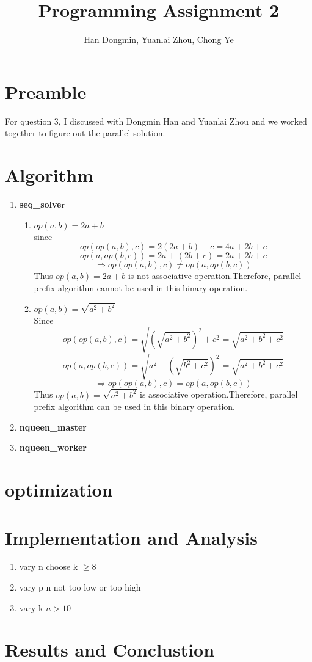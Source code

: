 \documentclass[twoside,12pt]{article}
\title{Programming Assignment 2}
\author{Han Dongmin, Yuanlai Zhou, Chong Ye}
\begin{document}
\maketitle

\section{Preamble}
For question 3, I discussed with Dongmin Han and Yuanlai Zhou and we worked together to figure out the parallel solution. 


\section{Algorithm}
\begin{enumerate}
\item
\textbf{seq\_solve}r
\begin{enumerate}
	\item $ op(a,b)=2a+b $ \\
	since \[ op(op(a,b),c)=2(2a+b)+c=4a+2b+c \]
	\[ op(a,op(b,c))=2a+(2b+c)=2a+2b+c \]
	\[ \Rightarrow op(op(a,b),c) \neq op(a,op(b,c)) \]
	Thus $ op(a,b)=2a+b $ is not associative operation.Therefore, parallel prefix algorithm cannot be used in this binary operation.
	\item $ op(a,b)=\sqrt{a^2+b^2} $\\
	Since
	\[ op(op(a,b),c)=\sqrt{(\sqrt{a^2+b^2})^2+c^2}=\sqrt{a^2+b^2+c^2} \]
	\[ op(a,op(b,c))=\sqrt{a^2+(\sqrt{b^2+c^2})^2}=\sqrt{a^2+b^2+c^2} \]
	\[ \Rightarrow op(op(a,b),c)= op(a,op(b,c))\]
	Thus $ op(a,b)=\sqrt{a^2+b^2} $ is associative operation.Therefore, parallel prefix algorithm can be used in this binary operation.
\end{enumerate}

\setlength{\parindent}{1em}
\item \textbf{nqueen\_master}


\vspace{3mm}

\item \textbf{nqueen\_worker} \\

\end{enumerate}

\section{optimization}

\section{Implementation and Analysis}
\begin{enumerate}
\item vary n
choose  k $ \geq 8 $
\item vary p
n not too low or too high
\item vary k
$ n>10 $
\end{enumerate}

\section{Results and Conclustion}
     
\end{document}
